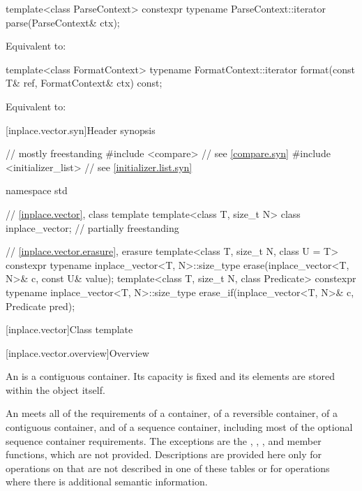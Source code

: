 %
\begin{itemdecl}
template<class ParseContext>
  constexpr typename ParseContext::iterator
    parse(ParseContext& ctx);
\end{itemdecl}

\begin{itemdescr}
\pnum
Equivalent to: 
\end{itemdescr}

%
\begin{itemdecl}
template<class FormatContext>
  typename FormatContext::iterator
    format(const T& ref, FormatContext& ctx) const;
\end{itemdecl}

\begin{itemdescr}
\pnum
Equivalent to: 
\end{itemdescr}

[inplace.vector.syn]{Header  synopsis}

%
\begin{codeblock}
// mostly freestanding
#include <compare>              // see \ref{compare.syn}
#include <initializer_list>     // see \ref{initializer.list.syn}

namespace std {
  // \ref{inplace.vector}, class template 
  template<class T, size_t N> class inplace_vector;             // partially freestanding

  // \ref{inplace.vector.erasure}, erasure
  template<class T, size_t N, class U = T>
    constexpr typename inplace_vector<T, N>::size_type
      erase(inplace_vector<T, N>& c, const U& value);
  template<class T, size_t N, class Predicate>
    constexpr typename inplace_vector<T, N>::size_type
      erase_if(inplace_vector<T, N>& c, Predicate pred);
}
\end{codeblock}

[inplace.vector]{Class template }

[inplace.vector.overview]{Overview}

\pnum
{}%
An  is a contiguous container.
Its capacity is fixed and
its elements are stored within the  object itself.

\pnum
An  meets all of the requirements
of a container,
of a reversible container,
of a contiguous container, and
of a sequence container,
including most of the optional sequence container requirements.
The exceptions are the
,
,
, and
member functions, which are not provided.
Descriptions are provided here only
for operations on  that
are not described in one of these tables or
for operations where there is additional semantic information.

